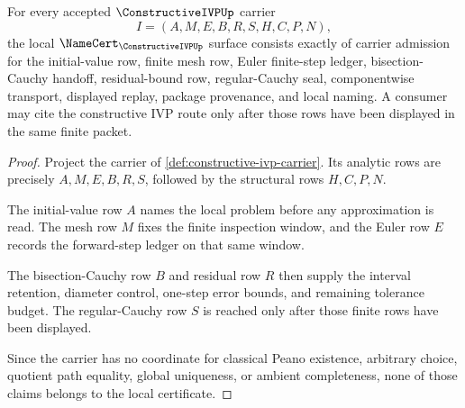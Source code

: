 \begin{theorem}
\label{thm:constructive-ivp-namecert-obligations}
For every accepted $\ConstructiveIVPUp$ carrier
$$
I=(A,M,E,B,R,S,H,C,P,N),
$$
the local $\NameCert_{\ConstructiveIVPUp}$ surface consists exactly of carrier admission for the initial-value row, finite mesh row, Euler finite-step ledger, bisection-Cauchy handoff, residual-bound row, regular-Cauchy seal, componentwise transport, displayed replay, package provenance, and local naming. A consumer may cite the constructive IVP route only after those rows have been displayed in the same finite packet.
\end{theorem}
\begin{proof}
Project the carrier of \autoref{def:constructive-ivp-carrier}. Its analytic rows are precisely $A,M,E,B,R,S$, followed by the structural rows $H,C,P,N$.

The initial-value row $A$ names the local problem before any approximation is read. The mesh row $M$ fixes the finite inspection window, and the Euler row $E$ records the forward-step ledger on that same window.

The bisection-Cauchy row $B$ and residual row $R$ then supply the interval retention, diameter control, one-step error bounds, and remaining tolerance budget. The regular-Cauchy row $S$ is reached only after those finite rows have been displayed.

Since the carrier has no coordinate for classical Peano existence, arbitrary choice, quotient path equality, global uniqueness, or ambient completeness, none of those claims belongs to the local certificate.
\end{proof}

